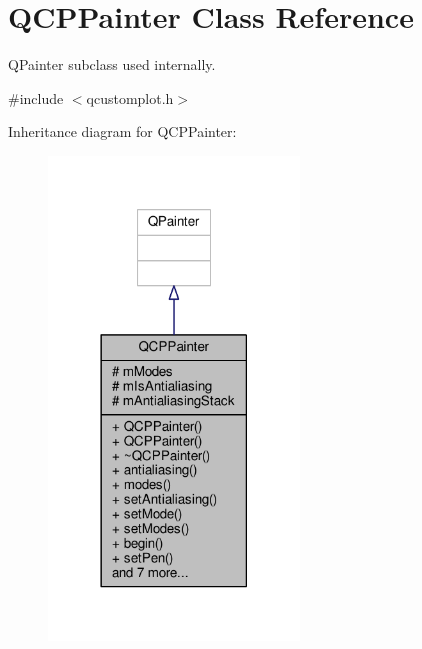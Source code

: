 \hypertarget{class_q_c_p_painter}{}\section{Q\+C\+P\+Painter Class Reference}
\label{class_q_c_p_painter}


Q\+Painter subclass used internally.  




{\ttfamily \#include $<$qcustomplot.\+h$>$}



Inheritance diagram for Q\+C\+P\+Painter\+:\nopagebreak
\begin{figure}[H]
\begin{center}
\leavevmode
\includegraphics[width=189pt]{class_q_c_p_painter__inherit__graph}
\end{center}
\end{figure}


